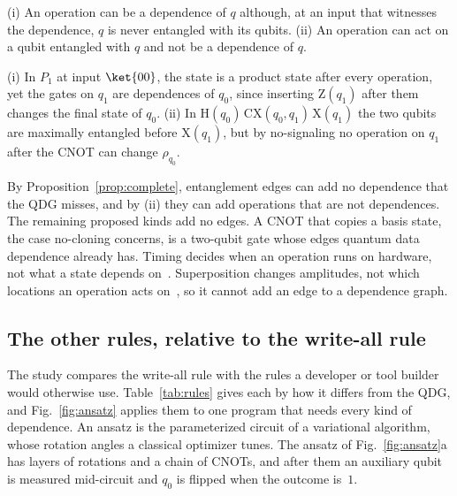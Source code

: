\begin{proposition}\label{prop:ent}
(i) An operation can be a dependence of $q$ although, at an input that witnesses the dependence, $q$ is never
entangled with its qubits. (ii) An operation can act on a qubit entangled with $q$ and not be a dependence of $q$.
\end{proposition}

\begin{IEEEproof}
(i) In $P_1$ at input $\ket{00}$, the state is a product state after every operation, yet the gates on $q_1$ are
dependences of $q_0$, since inserting $\mathrm{Z}(q_1)$ after them changes the final state of $q_0$. (ii) In
$\mathrm{H}(q_0)\,\mathrm{CX}(q_0, q_1)\,\mathrm{X}(q_1)$ the two qubits are maximally entangled before
$\mathrm{X}(q_1)$, but by no-signaling no operation on $q_1$ after the CNOT can change $\rho_{q_0}$.
\end{IEEEproof}

By Proposition~\ref{prop:complete}, entanglement edges can add no dependence that the QDG misses, and by (ii) they
can add operations that are not dependences. The remaining proposed kinds add no edges. A CNOT that copies a basis
state, the case no-cloning concerns, is a two-qubit gate whose edges quantum data dependence already has. Timing
decides when an operation runs on hardware, not what a state depends on~\cite{smith2022timestitch}.
Superposition changes amplitudes, not which locations an operation acts on~\cite{nielsen2010quantum}, so it cannot
add an edge to a dependence graph.

\subsection{The other rules, relative to the write-all rule}\label{sec:rules}
The study compares the write-all rule with the rules a developer or tool builder would otherwise use.
Table~\ref{tab:rules} gives each by how it differs from the QDG, and Fig.~\ref{fig:ansatz} applies them to one
program that needs every kind of dependence. An ansatz is the parameterized circuit of a variational algorithm,
whose rotation angles a classical optimizer tunes. The ansatz of Fig.~\ref{fig:ansatz}a has layers of rotations and
a chain of CNOTs, and after them an auxiliary qubit is measured mid-circuit and $q_0$ is flipped when the outcome
is~$1$.

